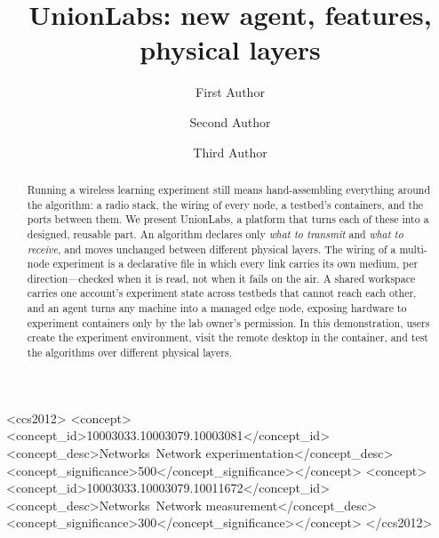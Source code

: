 \documentclass[sigconf,10pt]{acmart}
\begin{document}
\title{UnionLabs: new agent, features, physical layers}

\author{First Author}

\author{Second Author}

\author{Third Author}

\begin{abstract}
Running a wireless learning experiment still means hand-assembling everything
around the algorithm: a radio stack, the wiring of every node, a testbed's
containers, and the ports between them. We present UnionLabs, a platform that
turns each of these into a designed, reusable part. An algorithm declares only
\emph{what to transmit} and \emph{what to receive}, and moves unchanged
between different physical layers. The wiring of a multi-node experiment is a
declarative file in which every link carries its own medium, per
direction---checked when it is read, not when it fails on the air. A shared
workspace carries one account's experiment state across testbeds that cannot
reach each other, and an agent turns any machine into a managed edge node,
exposing hardware to experiment containers only by the lab owner's permission.
In this demonstration, users create the experiment environment, visit the
remote desktop in the container, and test the algorithms over different
physical layers.
\end{abstract}

\begin{CCSXML}
<ccs2012>
<concept><concept_id>10003033.10003079.10003081</concept_id>
<concept_desc>Networks~Network experimentation</concept_desc>
<concept_significance>500</concept_significance></concept>
<concept><concept_id>10003033.10003079.10011672</concept_id>
<concept_desc>Networks~Network measurement</concept_desc>
<concept_significance>300</concept_significance></concept>
</ccs2012>
\end{CCSXML}
\end{document}
